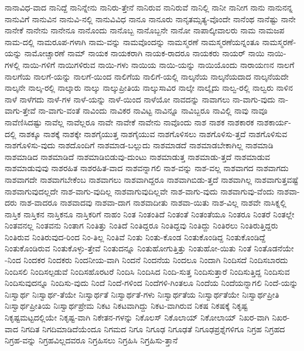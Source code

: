 {ನಾನಾವಿಧ-ವಾದ
ನಾನಿದ್ದೆ
ನಾನಿನ್ನೇನು
ನಾನಿರು-ತ್ತೇನೆ
ನಾನಿರುವ
ನಾನಿರುವೆ
ನಾನಿಲ್ಲಿ
ನಾನೀ
ನಾನೀಗ
ನಾನು
ನಾನುನನ್ನ
ನಾನುವಿಗೆ
ನಾನುವಿನ
ನಾನುವಿ-ನಲ್ಲಿ
ನಾನುವಿವಿಧ
ನಾನೂ
ನಾನೂರು
ನಾನೃತಮ್ಸತ್ಯ-ವೊಂದೇ
ನಾನೆಂಥ
ನಾನೆಷ್ಟು
ನಾನೇ
ನಾನೇಕೆ
ನಾನೇನು
ನಾನೇನೂ
ನಾನೊಂದು
ನಾನೊಬ್ಬ
ನಾನೊಬ್ಬನೇ
ನಾನೋ
ನಾಪಾಲ್ಕೀವಾಲರು
ನಾಮ
ನಾಮಜಪ
ನಾಮ-ದಲ್ಲಿ
ನಾಮರೂಪ-ಗಳಾಗಿ
ನಾಮ-ವನ್ನು
ನಾಮವೊಂದನ್ನು
ನಾಮಸ್ಮರಣೆ
ನಾಮಸ್ಮರಣೆಯನ್ನಂತೂ
ನಾಮಸ್ಮರಣೆ-ಯನ್ನು
ನಾಮೋಚ್ಚಾರಣೆ
ನಾಮ್
ನಾಯಕ
ನಾಯಕರಾಗಿ
ನಾಯಕ-ರಾದರೂ
ನಾಯಕರು
ನಾಯರ್
ನಾಯಿ
ನಾಯಿ-ಗಳಲ್ಲಿ
ನಾಯಿ-ಗಳಿಗೆ
ನಾಯಿಗಳಿರುವ
ನಾಯಿ-ಗಳು
ನಾಯಿಯ
ನಾಯಿ-ಯನ್ನು
ನಾಯಿಯೊಂದು
ನಾರಾಯಣನ
ನಾಲಗೆ
ನಾಲಗೆಯ
ನಾಲಗೆ-ಯನ್ನು
ನಾಲಗೆ-ಯಿಂದ
ನಾಲಿಗೆಯ
ನಾಲಿಗೆ-ಯಲ್ಲಿ
ನಾಲ್ಕನೆಯ
ನಾಲ್ಕನೆಯದಾದ
ನಾಲ್ಕನೆಯದೇ
ನಾಲ್ಕನೇ
ನಾಲ್ಕ-ರಲ್ಲಿ
ನಾಲ್ಕಾರು
ನಾಲ್ಕು
ನಾಲ್ಕುಪ್ರೀತಿಯ
ನಾಲ್ಕುಸಾವಿರ
ನಾಲ್ಕೇ
ನಾಲ್ಕೈದು
ನಾಲ್ವ-ರಲ್ಲಿ
ನಾಲ್ವರು
ನಾಳಿನ
ನಾಳೆ
ನಾಳೆಗದು
ನಾಳೆ-ಗಳ
ನಾಳೆ-ಯನ್ನು
ನಾಳೆ-ಯಿಂದ
ನಾಳೆಯೋ
ನಾವದನ್ನು
ನಾವಾಗಲು
ನಾ-ವಾಗು-ವುದು
ನಾ-ವಾಗು-ತ್ತೇವೆ
ನಾ-ವಾಗು-ವಂತೆ
ನಾವಿಂದು
ನಾವಿಕರ
ನಾವಿಟ್ಟ
ನಾವಿನ್ನೂ
ನಾವಿಬ್ಬರೂ
ನಾವಿಲ್ಲಿ
ನಾವು
ನಾವೂ
ನಾವೆಣಿಸಿದಷ್ಟು
ನಾವೆಲ್ಲ
ನಾವೆಲ್ಲರೂ
ನಾವೇ
ನಾವೇಕೆ
ನಾವೇನು
ನಾವೊಂದು
ನಾಶ
ನಾಶಕ
ನಾಶಕಾರಕ
ನಾಶಕಾರ್ಯ-ದಲ್ಲಿ
ನಾಶಕ್ಕೂ
ನಾಶಕ್ಕೆ
ನಾಶಕ್ಕೇ
ನಾಶಗೈಯುತ್ತ
ನಾಶಗೈಯುವ
ನಾಶಗೊಳಿಸಲು
ನಾಶಗೊಳಿಸು-ತ್ತದೆ
ನಾಶಗೊಳಿಸುವ
ನಾಶಗೊಳಿಸು-ವುದು
ನಾಶದೊಂದಿಗೆ
ನಾಶಮಾಡ-ಬಲ್ಲುದು
ನಾಶಮಾಡದೆ
ನಾಶಮಾಡಬೇಕಾಗಿಲ್ಲ
ನಾಶಮಾಡಿ
ನಾಶಮಾಡಿದ
ನಾಶಮಾಡಿದೆ
ನಾಶಮಾಡಿಬಿಡುವು-ದುಂಟು
ನಾಶಮಾಡುತ್ತ
ನಾಶಮಾಡು-ತ್ತದೆ
ನಾಶಮಾಡುವ
ನಾಶಮಾಡುವುವು
ನಾಶರಹಿತ
ನಾಶರಹಿತ-ವಾದ
ನಾಶವನ್ನಾಗಲಿ
ನಾಶ-ವನ್ನು
ನಾಶ-ವಲ್ಲ
ನಾಶವಾಗದ
ನಾಶವಾಗದು
ನಾಶವಾಗದೇ
ನಾಶವಾಗಬೇಕೆಂಬ
ನಾಶವಾಗಲು
ನಾಶವಾಗಿದ್ದರೂ
ನಾಶವಾಗಿಬಿಡು-ತ್ತದೆ
ನಾಶವಾಗಿಲ್ಲ
ನಾಶವಾಗುತ್ತವಷ್ಟೆ
ನಾಶವಾಗುವುದಲ್ಲದೇ
ನಾಶ-ವಾಗು-ವುದಿಲ್ಲ
ನಾಶವಾಗುವುದಿಲ್ಲವೇ
ನಾಶ-ವಾಗು-ವುದು
ನಾಶವಾಗುವು-ವೆಂದು
ನಾಶವಾ-ದರು
ನಾಶ-ವಾದರೂ
ನಾಶವಾದವು
ನಾಶವಾ-ದಾಗ
ನಾಶವಾದೀತು
ನಾಶವಾ-ಯಿತು
ನಾಶ-ವಿಲ್ಲ
ನಾಶವೇ
ನಾಸಿಕ್ನಲ್ಲಿ
ನಾಸ್ತಿಕ
ನಾಸ್ತಿಕನ
ನಾಸ್ತಿಕನೂ
ನಾಸ್ತಿಕರಿಗೆ
ನಾಹಂ
ನಿಂತ
ನಿಂತಂತಿದೆ
ನಿಂತಂತೆ
ನಿಂತಂತೆಯೂ
ನಿಂತರೂ
ನಿಂತರೆ
ನಿಂತಲ್ಲೇ
ನಿಂತವನಲ್ಲ
ನಿಂತವನು
ನಿಂತಾಗ
ನಿಂತಿತ್ತು
ನಿಂತಿದೆ
ನಿಂತಿದ್ದರೂ
ನಿಂತಿದ್ದವು
ನಿಂತಿದ್ದು
ನಿಂತಿರಲು
ನಿಂತಿರುತ್ತಿದ್ದರು
ನಿಂತಿರುವ
ನಿಂತಿರುವುದ-ರಿಂದ
ನಿಂ-ತಿಲ್ಲ
ನಿಂತಿವೆ
ನಿಂತು
ನಿಂತು-ಕೊಂಡ
ನಿಂತುಕೊಂಡಿದ್ದ
ನಿಂತುಕೊಂಡಿದ್ದೆ
ನಿಂತುಕೊಂಡಿರುವ
ನಿಂತುಕೊಳ್ಳು-ತ್ತೇವೆ
ನಿಂತುದನ್ನೂ
ನಿಂತುಹೋಗುತ್ತಿತ್ತು
ನಿಂತುಹೋ-ಯಿತು
ನಿಂತೆ
ನಿಂತೊಡನೆಯೇ
-ನಿಂದ
ನಿಂದಕರ
ನಿಂದಕರು
ನಿಂದನೀಯ-ವಾಗಿ
ನಿಂದನೆ
ನಿಂದನೆಯ
ನಿಂದಲೂ
ನಿಂದಾಗಿ
ನಿಂದಿಸದೆ
ನಿಂದಿಸಬಾರದು
ನಿಂದಿಸಲಿ
ನಿಂದಿಸಲ್ಪಡುವೆ
ನಿಂದಿಸಹೊರಟರೆ
ನಿಂದಿಸಿ
ನಿಂದಿಸಿದ
ನಿಂದಿ-ಸುತ್ತ
ನಿಂದಿಸುತ್ತಾರೆ
ನಿಂದಿಸುತ್ತಿದ್ದ
ನಿಂದಿಸುವ
ನಿಂದಿಸುವುದನ್ನೂ
ನಿಂದಿಸು-ವುದು
ನಿಂದೆ
ನಿಂದೆ-ಗಳಿಂದ
ನಿಂದೆಗಳಿ-ಗಿಂತಲೂ
ನಿಂದೆಯ
ನಿಂದೆಯನ್ನಾಗಲಿ
ನಿಂದೆ-ಯನ್ನು
ನಿಃಸ್ವಾರ್ಥ
ನಿಃಸ್ವಾರ್ಥ-ತೆಯೇ
ನಿಃಸ್ವಾರ್ಥತೆ
ನಿಃಸ್ವಾರ್ಥತೆ-ಗಳು
ನಿಃಸ್ವಾರ್ಥತೆಯ
ನಿಃಸ್ವಾರ್ಥತೆಯೇ
ನಿಃಸ್ವಾರ್ಥಪ್ರೀತಿ
ನಿಃಸ್ವಾರ್ಥಪ್ರೀತಿಯ
ನಿಃಸ್ವಾರ್ಥಪ್ರೇಮ
ನಿಕಟ
ನಿಕಟವಾಗಿದ್ದು
ನಿಕಟ-ವಾಗಿರುವ
ನಿಕಷ
ನಿಕಷಕ್ಕೆ
ನಿಕೃಷ್ಟ
ನಿಕೃಷ್ಟಮಟ್ಟದಲ್ಲಿಯೇ
ನಿಕೃಷ್ಟ-ವಾಗಿ
ನಿಕೇತನ-ಗಳನ್ನು
ನಿಕೊಲಸ್
ನಿಕೊಲಾಯ್
ನಿಕೋಲಾಯ್
ನಿಖರ-ವಾಗಿ
ನಿಖರ-ವಾದ
ನಿಗದಿತ
ನಿಗದಿಮಾಡಿದೆಯೆಂದೂ
ನಿಗಮದ
ನಿಗೂ
ನಿಗೂಢ
ನಿಗೂಢತೆ
ನಿಗೂಢಪ್ರಶ್ನೆಗಳಿಗೂ
ನಿಗ್ರಹ
ನಿಗ್ರಹದ
ನಿಗ್ರಹ-ವನ್ನು
ನಿಗ್ರಹವಿಲ್ಲದವರೂ
ನಿಗ್ರಹಿಸಲು
ನಿಗ್ರಹಿಸಿ
ನಿಗ್ರಹಿಸು-ತ್ತಾನೆ
}
